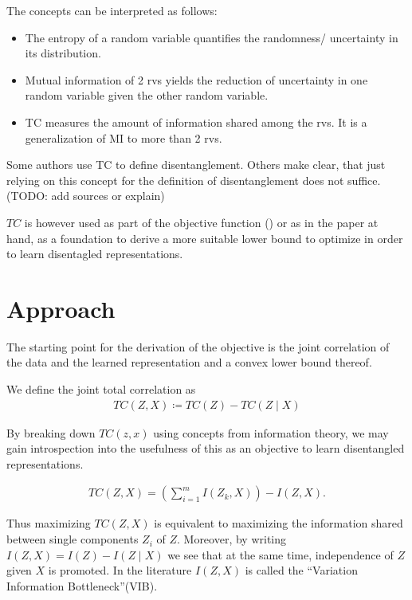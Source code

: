 \documentclass[twoside,11pt]{article}
\begin{document}
\begin{remark}[Interpretation]
  The concepts can be interpreted as follows:
  \begin{itemize}
    \item The entropy of a random variable quantifies the randomness/ uncertainty in its distribution.
    \item Mutual information of 2 rvs yields the reduction of uncertainty in one random variable given the other random variable.
    \item TC measures the amount of information shared among the rvs. It is a generalization of MI to more than 2 rvs.
  \end{itemize}
\end{remark}

 Some authors use TC to define disentanglement. Others make clear, that just relying on this concept for the definition of disentanglement does not suffice. (TODO: add sources or explain)

$TC$ is however used as part of the objective function (\cite{FactorVAE}) or as in the paper at hand, as a foundation to derive a more suitable lower bound to optimize in order to learn disentagled representations.

\section{Approach}
The starting point for the derivation of the objective is the joint correlation of the data and the learned representation and a convex lower bound thereof.
\begin{definition}
  We define the joint total correlation as
  \begin{align*}
    TC(Z, X) \coloneqq TC(Z) - TC(Z \mid X)
  \end{align*}
\end{definition}
By breaking down $TC(z, x)$ using concepts from information theory, we may gain introspection into the usefulness of this as an objective to learn disentangled representations.


\begin{proposition}
  \begin{align*}
    TC(Z, X) = (\sum_{i=1}^{m}I(Z_{k}, X)) - I(Z,X).
  \end{align*}
\end{proposition}
Thus maximizing $TC(Z,X)$ is equivalent to maximizing the information shared between single components $Z_{i}$ of $Z$.
Moreover, by writing $I(Z,X) = I(Z) - I(Z \mid X)$ we see that at the same time, independence of $Z$ given $X$ is promoted.
In the literature $I(Z,X)$ is called the \enquote{Variation Information Bottleneck}(VIB).
\end{document}
